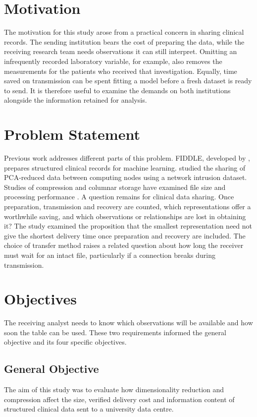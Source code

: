 \section{Motivation}\label{Motivation}
\noindent The motivation for this study arose from a practical concern in sharing clinical records. The sending institution bears the cost of preparing the data, while the receiving research team needs observations it can still interpret. Omitting an infrequently recorded laboratory variable, for example, also removes the measurements for the patients who received that investigation. Equally, time saved on transmission can be spent fitting a model before a fresh dataset is ready to send. It is therefore useful to examine the demands on both institutions alongside the information retained for analysis.

\section{Problem Statement}\label{problem_statement}
\noindent Previous work addresses different parts of this problem. FIDDLE, developed by \citet{Tang2020}, prepares structured clinical records for machine learning. \citet{LeeShinLee2025} studied the sharing of PCA-reduced data between computing nodes using a network intrusion dataset. Studies of compression and columnar storage have examined file size and processing performance \citep{Kryukov2020,Zeng2023,Lee2026}. A question remains for clinical data sharing. Once preparation, transmission and recovery are counted, which representations offer a worthwhile saving, and which observations or relationships are lost in obtaining it? The study examined the proposition that the smallest representation need not give the shortest delivery time once preparation and recovery are included. The choice of transfer method raises a related question about how long the receiver must wait for an intact file, particularly if a connection breaks during transmission.

\section{Objectives}\label{Objectives}
\noindent The receiving analyst needs to know which observations will be available and how soon the table can be used. These two requirements informed the general objective and its four specific objectives.

\subsection{General Objective}
\noindent The aim of this study was to evaluate how dimensionality reduction and compression affect the size, verified delivery cost and information content of structured clinical data sent to a university data centre.


